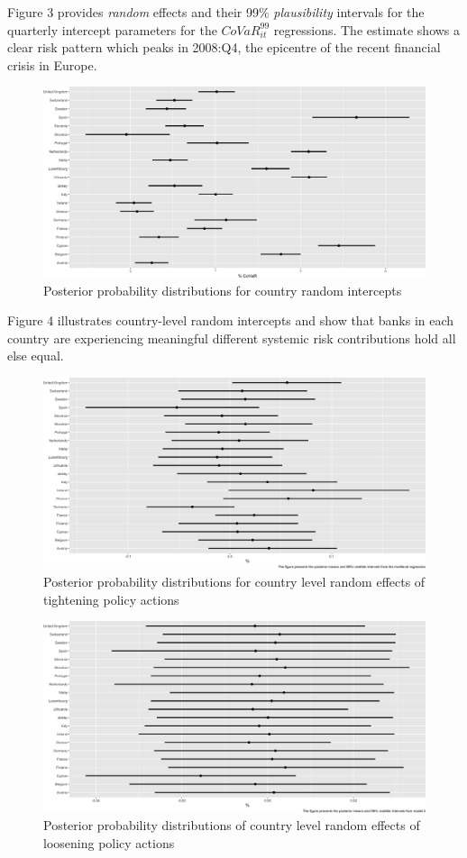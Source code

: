 \documentclass[
  10pt,
]{article}
\begin{document}
Figure 3 provides \emph{random} effects and their 99\%
\emph{plausibility} intervals for the quarterly intercept parameters for
the \(CoVaR^{99}_{it}\) regressions. The estimate shows a clear risk
pattern which peaks in 2008:Q4, the epicentre of the recent financial
crisis in Europe.

\begin{figure}
\centering
\includegraphics{figures/paper-fig4-1.png}
\caption{Posterior probability distributions for country random
intercepts}
\end{figure}

Figure 4 illustrates country-level random intercepts and show that banks
in each country are experiencing meaningful different systemic risk
contributions hold all else equal.

\begin{figure}
\centering
\includegraphics{figures/paper-fig5-1.png}
\caption{Posterior probability distributions for country level random
effects of tightening policy actions}
\end{figure}

\begin{figure}
\centering
\includegraphics{figures/paper-fig6-1.png}
\caption{Posterior probability distributions of country level random
effects of loosening policy actions}
\end{figure}
\end{document}
